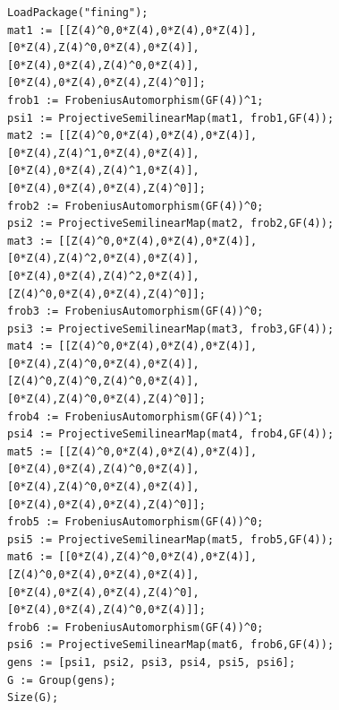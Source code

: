 \begin{verbatim}
LoadPackage("fining");
mat1 := [[Z(4)^0,0*Z(4),0*Z(4),0*Z(4)],
[0*Z(4),Z(4)^0,0*Z(4),0*Z(4)],
[0*Z(4),0*Z(4),Z(4)^0,0*Z(4)],
[0*Z(4),0*Z(4),0*Z(4),Z(4)^0]];
frob1 := FrobeniusAutomorphism(GF(4))^1;
psi1 := ProjectiveSemilinearMap(mat1, frob1,GF(4));
mat2 := [[Z(4)^0,0*Z(4),0*Z(4),0*Z(4)],
[0*Z(4),Z(4)^1,0*Z(4),0*Z(4)],
[0*Z(4),0*Z(4),Z(4)^1,0*Z(4)],
[0*Z(4),0*Z(4),0*Z(4),Z(4)^0]];
frob2 := FrobeniusAutomorphism(GF(4))^0;
psi2 := ProjectiveSemilinearMap(mat2, frob2,GF(4));
mat3 := [[Z(4)^0,0*Z(4),0*Z(4),0*Z(4)],
[0*Z(4),Z(4)^2,0*Z(4),0*Z(4)],
[0*Z(4),0*Z(4),Z(4)^2,0*Z(4)],
[Z(4)^0,0*Z(4),0*Z(4),Z(4)^0]];
frob3 := FrobeniusAutomorphism(GF(4))^0;
psi3 := ProjectiveSemilinearMap(mat3, frob3,GF(4));
mat4 := [[Z(4)^0,0*Z(4),0*Z(4),0*Z(4)],
[0*Z(4),Z(4)^0,0*Z(4),0*Z(4)],
[Z(4)^0,Z(4)^0,Z(4)^0,0*Z(4)],
[0*Z(4),Z(4)^0,0*Z(4),Z(4)^0]];
frob4 := FrobeniusAutomorphism(GF(4))^1;
psi4 := ProjectiveSemilinearMap(mat4, frob4,GF(4));
mat5 := [[Z(4)^0,0*Z(4),0*Z(4),0*Z(4)],
[0*Z(4),0*Z(4),Z(4)^0,0*Z(4)],
[0*Z(4),Z(4)^0,0*Z(4),0*Z(4)],
[0*Z(4),0*Z(4),0*Z(4),Z(4)^0]];
frob5 := FrobeniusAutomorphism(GF(4))^0;
psi5 := ProjectiveSemilinearMap(mat5, frob5,GF(4));
mat6 := [[0*Z(4),Z(4)^0,0*Z(4),0*Z(4)],
[Z(4)^0,0*Z(4),0*Z(4),0*Z(4)],
[0*Z(4),0*Z(4),0*Z(4),Z(4)^0],
[0*Z(4),0*Z(4),Z(4)^0,0*Z(4)]];
frob6 := FrobeniusAutomorphism(GF(4))^0;
psi6 := ProjectiveSemilinearMap(mat6, frob6,GF(4));
gens := [psi1, psi2, psi3, psi4, psi5, psi6];
G := Group(gens);
Size(G);
\end{verbatim}
